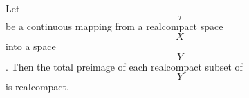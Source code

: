 Let $$\tau$$ be a continuous mapping from a realcompact space $$X$$ into a space $$Y$$. Then the total preimage of each realcompact subset of $$Y$$ is realcompact.
